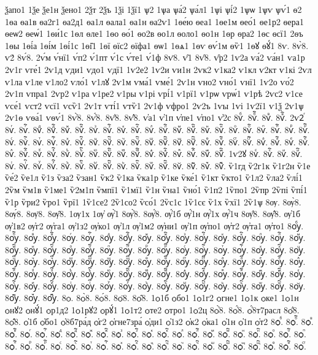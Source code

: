 {ѯапо1
1ѯе
ѯе1н
ѯено1
2ѯт
2ѯъ
1ѯі
1ѯї1
ѱ2
1ѱа
ѱа́2
ѱа́л1
1ѱі
ѱі́2
1ѱѡ
1ѱѵ
ѱѵ́1
ѳ2
1ѳа
ѳа1в
ѳа2г1
ѳа2д1
ѳа1л
ѳала1
ѳа1н
ѳа2ѵ1
1ѳе́ю
ѳеа1
1ѳе1м
ѳео́1
ѳе1р2
ѳера1
ѳеѡ2
ѳеѡ́1
1ѳи́1с
1ѳл
ѳле1
1ѳо
ѳо́1
ѳо2в
ѳо1л
ѳоло1
ѳо1н
1ѳр
ѳра2
1ѳс
ѳсї1
2ѳъ
1ѳы
1ѳі́а
1ѳі́м
1ѳі́1с
1ѳі̑1
1ѳї
ѳїс2
ѳїфа1
ѳѡ1
1ѳѧ1
1ѳѵ
ѳѵ́1м
ѳѷ1
1ѳꙋ
ѳꙋ́1
8ѵ.
8ѵ̀8.
ѵ2́
8ѵ́8.
2ѵ́м
ѵ́нї1
ѵ́п2
ѵ́1пт
ѵ́1с
ѵ́те1
ѵ́1ф
8ѵ̈8.
ѵ̑1
8ѵ̑8.
ѵ̑р2
1ѵ2а
ѵа́2
ѵа́н1
ѵа1р
2ѵ1г
ѵге́1
2ѵ1д
ѵди1
ѵдо1
ѵдї1
1ѵ2е2
1ѵ2и
ѵи1н
2ѵк2
ѵ1ка2
ѵ1кл
ѵ2кт
ѵ1кі
2ѵл
ѵ1ла
ѵ1ле
ѵ1ло2
ѵло́1
ѵ1лꙋ
2ѵ1м
ѵма́1
ѵме́1
2ѵ1н
ѵно2
ѵно́1
ѵнї1
1ѵ2о
ѵо́2
2ѵ1п
ѵпра1
2ѵр2
ѵ1ра
ѵ1ре2
ѵ1ры
ѵ1рі
ѵрі́1
ѵ1рї1
ѵ1рѡ
ѵрѡ́1
ѵ1рѣ
2ѵс2
ѵ1се
ѵсе́1
ѵст2
ѵсї1
ѵсѷ1
2ѵ1т
ѵті́1
ѵтѷ1
2ѵ1ф
ѵфро1
2ѵ2ъ
1ѵы
1ѵі
1ѵ2ї1
ѵ1ѯ
2ѵ1ѱ
2ѵ1ѳ
ѵѳа́1
ѵѳѵ́1
8ѵ҆̀8.
8ѵ҆́8.
8ѵ҆̈8.
8ѵ҆̑8.
ѵ҆а1
ѵ҆1п
ѵ҆пе1
ѵ҆по1
ѵ҆2с
8ѵⷠ.
8ѵⷠ҇.
8ѵⷡ.
8ѵⷡ҇.
2ѵ2ⷢ
8ѵⷢ.
8ѵⷢ҇.
8ѵⷣ.
8ѵⷣ҇.
8ѵⷤ.
8ѵⷤ҇.
8ѵⷥ.
8ѵⷥ҇.
8ѵⷦ.
8ѵⷦ҇.
8ѵⷧ.
8ѵⷧ҇.
8ѵⷨ.
8ѵⷨ҇.
8ѵⷩ.
8ѵⷩ҇.
8ѵⷪ.
8ѵⷪ҇.
8ѵⷫ.
8ѵⷫ҇.
8ѵⷬ.
8ѵⷬ҇.
8ѵⷭ.
8ѵⷭ҇.
8ѵⷮ.
8ѵⷮ҇.
8ѵⷯ.
8ѵⷯ҇.
8ѵⷰ.
8ѵⷰ҇.
8ѵⷱ.
8ѵⷱ҇.
8ѵⷲ.
8ѵⷲ҇.
8ѵⷳ.
8ѵⷳ҇.
8ѵⷴ.
8ѵⷴ҇.
8ѵⷵ.
8ѵⷵ҇.
8ѵⷶ.
8ѵⷶ҇.
8ѵⷷ.
8ѵⷷ҇.
8ѵⷸ.
8ѵⷸ҇.
8ѵⷹ.
8ѵⷹ҇.
8ѵⷺ.
8ѵⷺ҇.
8ѵⷻ.
8ѵⷻ҇.
8ѵⷼ.
8ѵⷼ҇.
8ѵⷽ.
8ѵⷽ҇.
8ѵⷾ.
8ѵⷾ҇.
8ѵⷿ.
8ѵⷿ҇.
1ѵ2ꙋ
8ѵꙴ.
8ѵꙴ҇.
8ѵꙵ.
8ѵꙵ҇.
8ѵꙶ.
8ѵꙶ҇.
8ѵꙷ.
8ѵꙷ҇.
8ѵꙸ.
8ѵꙸ҇.
8ѵꙹ.
8ѵꙹ҇.
8ѵꙺ.
8ѵꙺ҇.
8ѵꙻ.
8ѵꙻ҇.
8ѵ꙼.
8ѵ꙼҇.
8ѵ꙽.
8ѵ꙽҇.
ѷ1гд
ѷ2г1к
ѷ1г2н
ѷ1е
ѷе́2
ѷе1л
ѷ1з
ѷза2
ѷзан1
ѷк2
ѷ1ка
ѷка1р
ѷ1ке
ѷке́1
ѷ1кт
ѷкто1
ѷ1л2
ѷла2
ѷлі́1
2ѷм
ѷм1в
ѷ1ме1
ѷ2м1п
ѷмпї1
ѷ1мї1
ѷ1н
ѷна1
ѷно́1
ѷ1п2
1ѷпо1
2ѷпр
2ѷпі
ѷпі́1
ѷ1р
ѷри2
ѷро1
ѷрї1
1ѷ1се2
2ѷ1со2
ѷсо́1
2ѷс1с
1ѷ1сє
ѷ1х
ѷхї1
2ѷ1ѱ
8ѹ.
8ѹ̀8.
8ѹ́8.
8ѹ̈8.
8ѹ̑8.
1ѹ1х
1ѹ҆
ѹ҆̀1
8ѹ҆̀8.
8ѹ҆́8.
ѹ҆́1б
ѹ҆́1н
ѹ҆́1х
ѹ҆́1ч
8ѹ҆̈8.
8ѹ҆̑8.
ѹ҆1б
ѹ҆1в2
ѹ҆г2
ѹ҆га1
ѹ҆1з2
ѹ҆ко1
ѹ҆1л
ѹ҆1м2
ѹ҆ни1
ѹ҆1п
ѹ҆по1
ѹ҆т2
ѹ҆та1
ѹ҆то1
8ѹⷠ.
8ѹⷠ҇.
8ѹⷡ.
8ѹⷡ҇.
8ѹⷢ.
8ѹⷢ҇.
8ѹⷣ.
8ѹⷣ҇.
8ѹⷤ.
8ѹⷤ҇.
8ѹⷥ.
8ѹⷥ҇.
8ѹⷦ.
8ѹⷦ҇.
8ѹⷧ.
8ѹⷧ҇.
8ѹⷨ.
8ѹⷨ҇.
8ѹⷩ.
8ѹⷩ҇.
8ѹⷪ.
8ѹⷪ҇.
8ѹⷫ.
8ѹⷫ҇.
8ѹⷬ.
8ѹⷬ҇.
8ѹⷭ.
8ѹⷭ҇.
8ѹⷮ.
8ѹⷮ҇.
8ѹⷯ.
8ѹⷯ҇.
8ѹⷰ.
8ѹⷰ҇.
8ѹⷱ.
8ѹⷱ҇.
8ѹⷲ.
8ѹⷲ҇.
8ѹⷳ.
8ѹⷳ҇.
8ѹⷴ.
8ѹⷴ҇.
8ѹⷵ.
8ѹⷵ҇.
8ѹⷶ.
8ѹⷶ҇.
8ѹⷷ.
8ѹⷷ҇.
8ѹⷸ.
8ѹⷸ҇.
8ѹⷹ.
8ѹⷹ҇.
8ѹⷺ.
8ѹⷺ҇.
8ѹⷻ.
8ѹⷻ҇.
8ѹⷼ.
8ѹⷼ҇.
8ѹⷽ.
8ѹⷽ҇.
8ѹⷾ.
8ѹⷾ҇.
8ѹⷿ.
8ѹⷿ҇.
8ѹꙴ.
8ѹꙴ҇.
8ѹꙵ.
8ѹꙵ҇.
8ѹꙶ.
8ѹꙶ҇.
8ѹꙷ.
8ѹꙷ҇.
8ѹꙸ.
8ѹꙸ҇.
8ѹꙹ.
8ѹꙹ҇.
8ѹꙺ.
8ѹꙺ҇.
8ѹꙻ.
8ѹꙻ҇.
8ѹ꙼.
8ѹ꙼҇.
8ѹ꙽.
8ѹ꙽҇.
8ѻ.
8ѻ̀8.
8ѻ́8.
8ѻ̈8.
8ѻ̑8.
1ѻ1б
ѻбо1
1ѻ1г2
ѻгне1
1ѻ1к
ѻке1
1ѻ1н
ѻнꙋ2
ѻнꙋ́1
ѻр1д2
1ѻ1рꙋ2
ѻрꙋ́1
1ѻ1т2
ѻте2
ѻтро1
1ѻ2ц
8ѻ҆̀8.
8ѻ҆́8.
ѻ҆́8т7расл
8ѻ҆̈8.
8ѻ҆̑8.
ѻ҆1б
ѻ҆бо1
ѻ҆8б7ра́д
ѻ҆г2
ѻ҆гне7зра́
ѻ҆ди1
ѻ҆1з2
ѻ҆к2
ѻ҆ка1
ѻ҆1н
ѻ҆1п
ѻ҆т2
8ѻⷠ.
8ѻⷠ҇.
8ѻⷡ.
8ѻⷡ҇.
8ѻⷢ.
8ѻⷢ҇.
8ѻⷣ.
8ѻⷣ҇.
8ѻⷤ.
8ѻⷤ҇.
8ѻⷥ.
8ѻⷥ҇.
8ѻⷦ.
8ѻⷦ҇.
8ѻⷧ.
8ѻⷧ҇.
8ѻⷨ.
8ѻⷨ҇.
8ѻⷩ.
8ѻⷩ҇.
8ѻⷪ.
8ѻⷪ҇.
8ѻⷫ.
8ѻⷫ҇.
8ѻⷬ.
8ѻⷬ҇.
8ѻⷭ.
8ѻⷭ҇.
8ѻⷮ.
8ѻⷮ҇.
8ѻⷯ.
8ѻⷯ҇.
8ѻⷰ.
8ѻⷰ҇.
8ѻⷱ.
8ѻⷱ҇.
8ѻⷲ.
8ѻⷲ҇.
8ѻⷳ.
8ѻⷳ҇.
8ѻⷴ.
8ѻⷴ҇.
8ѻⷵ.
}
